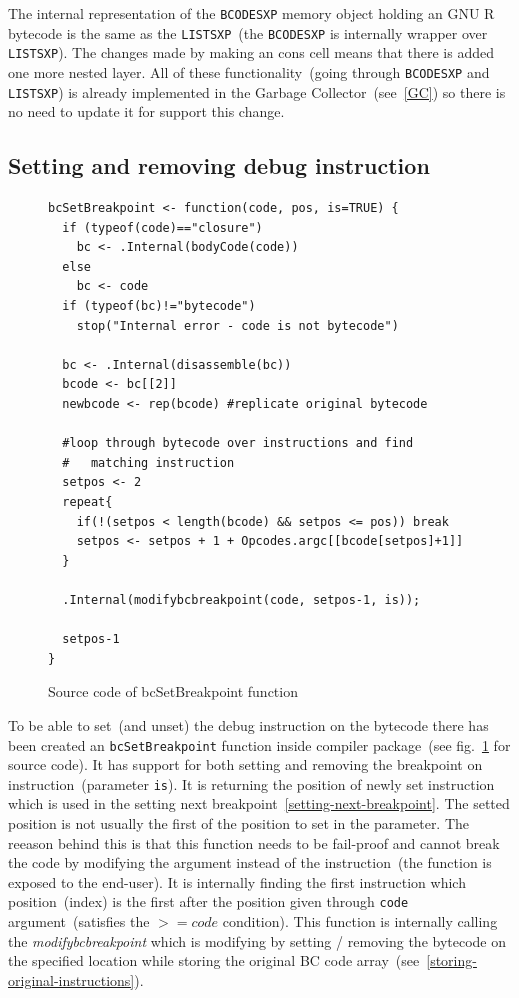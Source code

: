 \documentclass[thesis=M,english]{FITthesis}[2018/10/20]
\newcommand{\code}[1]{\texttt{#1}}
\begin{document}
The internal representation of the \code{BCODESXP} memory object holding an GNU R bytecode is the same as the \code{LISTSXP}~(the \code{BCODESXP} is internally wrapper over \code{LISTSXP}). The changes made by making an cons cell means that there is added one more nested layer. All of these functionality~(going through \code{BCODESXP} and \code{LISTSXP}) is already implemented in the Garbage Collector~(see~\ref{GC}) so there is no need to update it for support this change.

\subsection{Setting and removing debug instruction}\label{setting-and-unsetting-debug-instruction}

\begin{figure}[h]
\begin{lstlisting}
bcSetBreakpoint <- function(code, pos, is=TRUE) {
  if (typeof(code)=="closure")
    bc <- .Internal(bodyCode(code))
  else
    bc <- code
  if (typeof(bc)!="bytecode") 
    stop("Internal error - code is not bytecode")

  bc <- .Internal(disassemble(bc))
  bcode <- bc[[2]]
  newbcode <- rep(bcode) #replicate original bytecode

  #loop through bytecode over instructions and find 
  #   matching instruction
  setpos <- 2
  repeat{
    if(!(setpos < length(bcode) && setpos <= pos)) break
    setpos <- setpos + 1 + Opcodes.argc[[bcode[setpos]+1]]
  }

  .Internal(modifybcbreakpoint(code, setpos-1, is));

  setpos-1
}
\end{lstlisting}
	\caption{Source code of bcSetBreakpoint function}\label{fig:bcsetbreakpoint-source}
\end{figure}

To be able to set~(and unset) the debug instruction on the bytecode there has been created an \code{bcSetBreakpoint} function inside compiler package~(see fig.~\ref{fig:bcsetbreakpoint-source} for source code). It has support for both setting and removing the breakpoint on instruction~(parameter \code{is}). It is returning the position of newly set instruction which is used in the setting next breakpoint~\ref{setting-next-breakpoint}. The setted position is not usually the first of the position to set in the parameter. The reeason behind this is that this function needs to be fail-proof and cannot break the code by modifying the argument instead of the instruction~(the function is exposed to the end-user). It is internally 
finding the first instruction which position~(index) is the first after the position given through \code{code} argument~(satisfies the \code{$>= code$} condition). This function is internally calling the \textit{modifybcbreakpoint} which is modifying by setting / removing the bytecode on the specified location while storing the original BC code array~(see~\ref{storing-original-instructions}).
\end{document}
